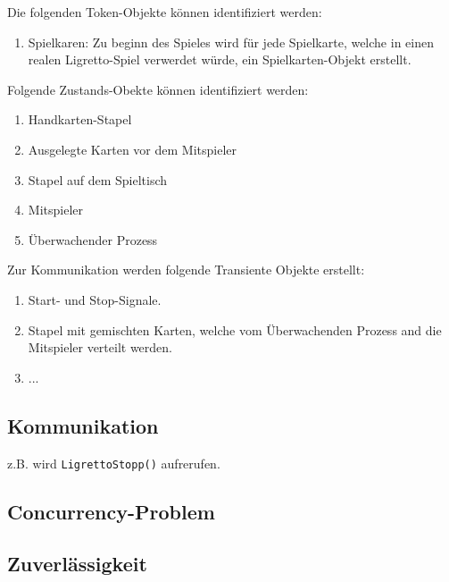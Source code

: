 Die folgenden Token-Objekte können identifiziert werden:
\begin{enumerate}
	\item Spielkaren: Zu beginn des Spieles wird für jede Spielkarte, welche in einen realen Ligretto-Spiel verwerdet würde, ein Spielkarten-Objekt erstellt.
\end{enumerate}

Folgende Zustands-Obekte können identifiziert werden:
\begin{enumerate}
	\item Handkarten-Stapel
	\item Ausgelegte Karten vor dem Mitspieler
	\item Stapel auf dem Spieltisch
	\item Mitspieler
	\item Überwachender Prozess
\end{enumerate}

Zur Kommunikation werden folgende Transiente Objekte erstellt:
\begin{enumerate}
	\item Start- und Stop-Signale.
	\item Stapel mit gemischten Karten, welche vom Überwachenden Prozess and die Mitspieler verteilt werden.
	\item ...
\end{enumerate}

\subsection{Kommunikation}


z.B. wird {\tt LigrettoStopp()} aufrerufen.








\subsection{Concurrency-Problem}


\subsection{Zuverlässigkeit}

